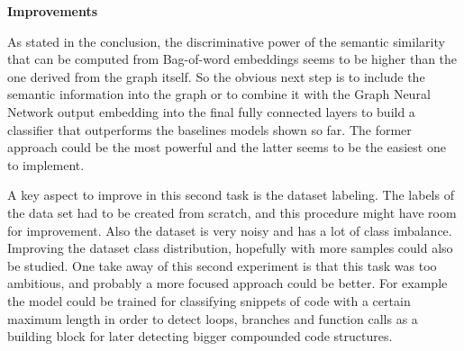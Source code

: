 \textbf{Improvements}

As stated in the conclusion, the discriminative power of the semantic similarity that can be computed from Bag-of-word embeddings seems to be higher than the one derived from the graph itself. So the obvious next step is to include the semantic information into the graph or to combine it with the Graph Neural Network output embedding into the final fully connected layers to build a classifier that outperforms the baselines models shown so far. The former approach could be the most powerful and the latter seems to be the easiest one to implement.

A key aspect to improve in this second task is the dataset labeling. The labels of the data set had to be created from scratch, and this procedure might have room for improvement. Also the dataset is very noisy and has a lot of class imbalance. Improving the dataset class distribution, hopefully with more samples could also be studied. One take away of this second experiment is that this task was too ambitious, and probably a more focused approach could be better. For example the model could be trained for classifying snippets of code with a certain maximum length in order to detect loops, branches and function calls as a building block for later detecting bigger compounded code structures.